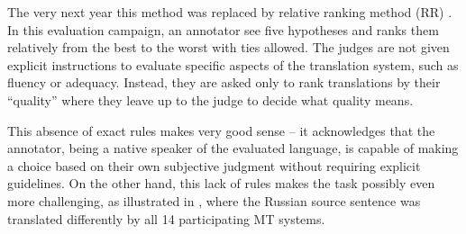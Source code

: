 The very next year this method was replaced by relative ranking method (RR) \citep{callison-burch-etal-2007-meta}. In this evaluation campaign, an annotator see five hypotheses and ranks them relatively from the best to the worst with ties allowed. The judges are not given explicit instructions to evaluate specific aspects of the translation system, such as fluency or adequacy. Instead, they are asked only to rank translations by their “quality” where they leave up to the judge to decide what quality means.


This absence of exact rules makes very good sense -- it acknowledges that the annotator, being a native speaker of the evaluated language,  is capable of making a choice based on their own subjective judgment without requiring explicit guidelines. On the other hand, this lack of rules makes the task possibly even more challenging, as illustrated in , where the Russian source sentence was translated differently by all 14 participating MT systems.

